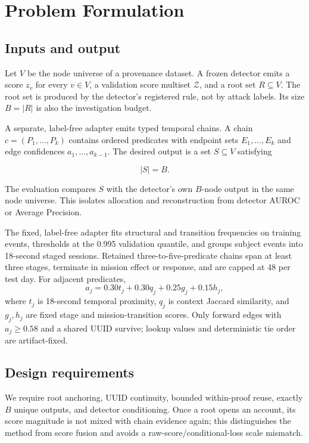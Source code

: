 \documentclass[runningheads]{llncs}
\begin{document}
\section{Problem Formulation}

\subsection{Inputs and output}

Let \(V\) be the node universe of a provenance dataset. A frozen detector emits a score \(z_v\) for every \(v\in V\), a validation score multiset \(\mathcal Z\), and a root set \(R\subseteq V\). The root set is produced by the detector's registered rule, not by attack labels. Its size \(B=|R|\) is also the investigation budget.

A separate, label-free adapter emits typed temporal chains. A chain \(c=(P_1,\ldots,P_k)\) contains ordered predicates with endpoint sets \(E_1,\ldots,E_k\) and edge confidences \(a_1,\ldots,a_{k-1}\). The desired output is a set \(S\subseteq V\) satisfying

\[
|S|=B.
\]

The evaluation compares \(S\) with the detector's own \(B\)-node output in the same node universe. This isolates allocation and reconstruction from detector AUROC or Average Precision.

The fixed, label-free adapter fits structural and transition frequencies on training events, thresholds at the 0.995 validation quantile, and groups subject events into 18-second staged sessions. Retained three-to-five-predicate chains span at least three stages, terminate in mission effect or response, and are capped at 48 per test day. For adjacent predicates,
\[
a_j=0.30t_j+0.30q_j+0.25g_j+0.15h_j,
\]
where \(t_j\) is 18-second temporal proximity, \(q_j\) is context Jaccard similarity, and \(g_j,h_j\) are fixed stage and mission-transition scores. Only forward edges with \(a_j\ge0.58\) and a shared UUID survive; lookup values and deterministic tie order are artifact-fixed.

\subsection{Design requirements}

We require root anchoring, UUID continuity, bounded within-proof reuse, exactly \(B\) unique outputs, and detector conditioning. Once a root opens an account, its score magnitude is not mixed with chain evidence again; this distinguishes the method from score fusion and avoids a raw-score/conditional-loss scale mismatch.
\end{document}

